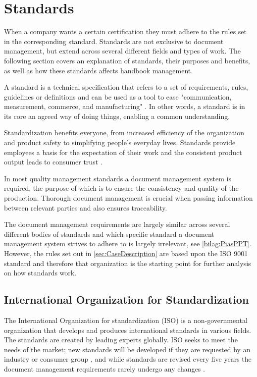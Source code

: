 \section{Standards} \label{sec:standards}
When a company wants a certain certification they must adhere to the rules set in the corresponding standard.
Standards are not exclusive to document management, but extend across several different fields and types of work.
The following section covers an explanation of standards, their purposes and benefits, as well as how these standards affects handbook management.

A standard is a technical specification that refers to a set of requirements, rules, guidelines or definitions \citep[p.~5]{Standard} and can be used as a tool to ease "communication, measurement, commerce, and manufacturing" \cite{Standardtool}.
In other words, a standard is in its core an agreed way of doing things, enabling a common understanding.

Standardization benefits everyone, from increased efficiency of the organization and product safety to simplifying people's everyday lives.
Standards provide employees a basis for the expectation of their work and the consistent product output leads to consumer trust \citep[p.~83]{Standardization}.

In most quality management standards a document management system is required, the purpose of which is to ensure the consistency and quality of the production.
Thorough document management is crucial when passing information between relevant parties and also ensures traceability.

The document management requirements are largely similar across several different bodies of standards and which specific standard a document management system strives to adhere to is largely irrelevant, see \cref{bilag:PiasPPT}.
However, the rules set out in \cref{sec:CaseDescription} are based upon the ISO 9001 standard and therefore that organization is the starting point for further analysis on how standards work.

\subsection{International Organization for Standardization} \label{sec:ISOstandards}
The International Organization for standardization (ISO) is a non-governmental organization that develops and produces international standards in various fields.
The standards are created by leading experts globally. \cite{ISOinfo}
ISO seeks to meet the needs of the market; new standards will be developed if they are requested by an industry or consumer group \cite{ISOdeveloping}, and while standards are revised every five years the document management requirements rarely undergo any changes \cite{ISOreviewedevery5years}.

